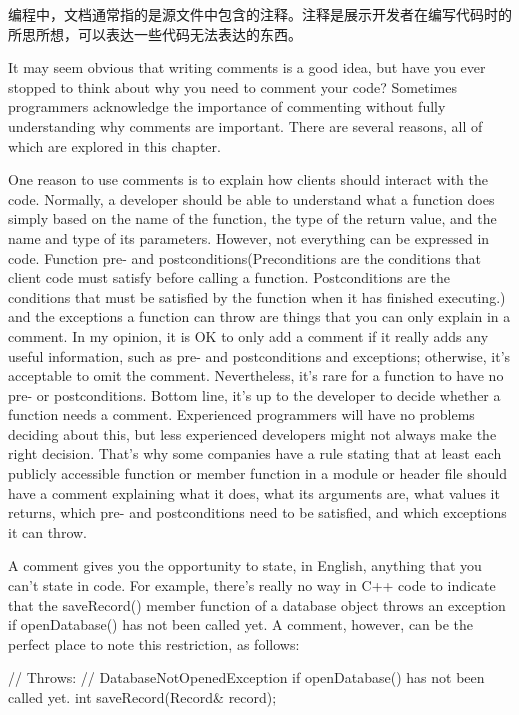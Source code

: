 
编程中，文档通常指的是源文件中包含的注释。注释是展示开发者在编写代码时的所思所想，可以表达一些代码无法表达的东西。


It may seem obvious that writing comments is a good idea, but have you ever stopped to think about why you need to comment your code? Sometimes programmers acknowledge the importance of commenting without fully understanding why comments are important. There are several reasons, all of which are explored in this chapter.


One reason to use comments is to explain how clients should interact with the code. Normally, a developer should be able to understand what a function does simply based on the name of the function, the type of the return value, and the name and type of its parameters. However, not everything can be expressed in code. Function pre- and postconditions(Preconditions are the conditions that client code must satisfy before calling a function. Postconditions are the conditions that must be satisfied by the function when it has finished executing.) and the exceptions a function can throw are things that you can only explain in a comment. In my opinion, it is OK to only add a comment if it really adds any useful information, such as pre- and postconditions and exceptions; otherwise, it’s acceptable to omit the comment. Nevertheless, it’s rare for a function to have no pre- or postconditions. Bottom line, it’s up to the developer to decide whether a function needs a comment. Experienced programmers will have no problems deciding about this, but less experienced developers might not always make the right decision. That’s why some companies have a rule stating that at least each publicly accessible function or member function in a module or header file should have a comment explaining what it does, what its arguments are, what values it returns, which pre- and postconditions need to be satisfied, and which exceptions it can throw.

A comment gives you the opportunity to state, in English, anything that you can’t state in code. For example, there’s really no way in C++ code to indicate that the saveRecord() member function of a database object throws an exception if openDatabase() has not been called yet. A comment, however, can be the perfect place to note this restriction, as follows:

\begin{cpp}
// Throws:
//    DatabaseNotOpenedException if openDatabase() has not been called yet.
int saveRecord(Record& record);
\end{cpp}

